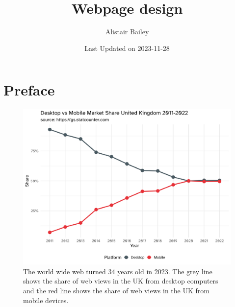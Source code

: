 \documentclass[
  letterpaper,
  DIV=11,
  numbers=noendperiod]{scrreprt}
\title{Webpage design}
\author{Alistair Bailey}
\date{Last Updated on 2023-11-28}
\renewcommand*\contentsname{Table of contents}
\newcommand\contentsname{Table of contents}
\begin{document}
\maketitle
\ifdefined\Shaded\renewenvironment{Shaded}{\begin{tcolorbox}[enhanced, boxrule=0pt, frame hidden, interior hidden, sharp corners, breakable, borderline west={3pt}{0pt}{shadecolor}]}{\end{tcolorbox}}\fi

\renewcommand*\contentsname{Table of contents}
{
\hypersetup{linkcolor=}
\setcounter{tocdepth}{2}
\tableofcontents
}

\hypertarget{preface}{%
\chapter*{Preface}\label{preface}}


\begin{figure}

{\centering \includegraphics[width=10in,height=\textheight]{./img/uk-web-views-2011-2022.png}

}

\caption{\label{fig-uk-web-use}The world wide web turned 34 years old in
2023. The grey line shows the share of web views in the UK from desktop
computers and the red line shows the share of web views in the UK from
mobile devices.}

\end{figure}
\end{document}
